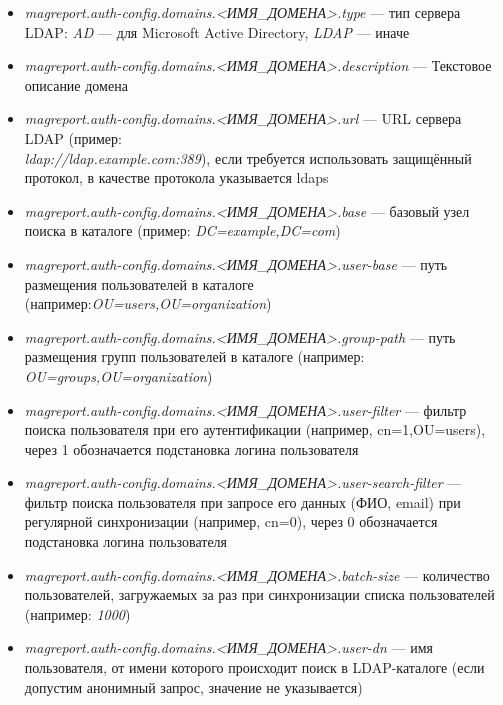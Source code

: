 \documentclass[../user-manual.tex]{subfiles}
\begin{document}
	\begin{itemize}
		
		\item \textit{magreport.auth-config.domains.<ИМЯ\_ДОМЕНА>.type} --- тип сервера LDAP: \textit{AD} --- для Microsoft Active Directory, \textit{LDAP} --- иначе
		
		\item \textit{magreport.auth-config.domains.<ИМЯ\_ДОМЕНА>.description} --- Текстовое описание домена
		
		\item \textit{magreport.auth-config.domains.<ИМЯ\_ДОМЕНА>.url} --- URL сервера LDAP (пример:\\ \textit{ldap://ldap.example.com:389}), если требуется использовать защищённый протокол, в качестве протокола указывается ldaps
		
		\item \textit{magreport.auth-config.domains.<ИМЯ\_ДОМЕНА>.base} --- базовый узел поиска в каталоге (пример: \textit{DC=example,DC=com})
		
		\item \textit{magreport.auth-config.domains.<ИМЯ\_ДОМЕНА>.user-base} --- путь размещения пользователей в каталоге (например:\textit{OU=users,OU=organization})
		
		\item \textit{magreport.auth-config.domains.<ИМЯ\_ДОМЕНА>.group-path} --- путь размещения групп пользователей в каталоге (например:\\ 
		\textit{OU=groups,OU=organization})
		
		\item \textit{magreport.auth-config.domains.<ИМЯ\_ДОМЕНА>.user-filter} --- фильтр поиска пользователя при его аутентификации (например, cn={1},OU=users), через {1} обозначается подстановка логина пользователя
		
		\item \textit{magreport.auth-config.domains.<ИМЯ\_ДОМЕНА>.user-search-filter} --- фильтр поиска пользователя при запросе его данных (ФИО, email) при регулярной синхронизации (например, cn={0}), через {0} обозначается подстановка логина пользователя
		
		\item \textit{magreport.auth-config.domains.<ИМЯ\_ДОМЕНА>.batch-size} --- количество пользователей, загружаемых за раз при синхронизации списка пользователей (например: \textit{1000})
		
		\item \textit{magreport.auth-config.domains.<ИМЯ\_ДОМЕНА>.user-dn} --- имя пользователя, от имени которого происходит поиск в LDAP-каталоге (если допустим анонимный запрос, значение не указывается)
		

\end{itemize}
\end{document}
